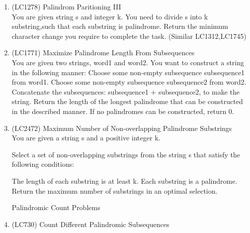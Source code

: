 \begin{exercise}
\begin{enumerate}
        \item (LC1278) Palindrom Paritioning III \\You are given string s and integer k. You need to divide s into k substring,such that each substring is palindrome. Return the minimum character change you require to complete the task. (Similar LC1312,LC1745)

        \item (LC1771) Maximize Palindrome Length From Subsequences\\ You are given two strings, word1 and word2. You want to construct a string in the following manner:
        Choose some non-empty subsequence subsequence1 from word1.
        Choose some non-empty subsequence subsequence2 from word2.
        Concatenate the subsequences: subsequence1 + subsequence2, to make the string.
        Return the length of the longest palindrome that can be constructed in the described manner. If no palindromes can be constructed, return 0.

        \item (LC2472)  Maximum Number of Non-overlapping Palindrome Substrings\\You are given a string s and a positive integer k.

        Select a set of non-overlapping substrings from the string s that satisfy the following conditions:
        
        The length of each substring is at least k.
        Each substring is a palindrome.
        Return the maximum number of substrings in an optimal selection.

        {\Large Palindromic Count Problems}

        \item (LC730) Count Different Palindromic Subsequences
       

    \end{enumerate}

\end{exercise}

